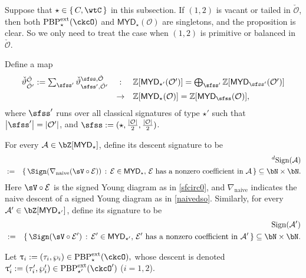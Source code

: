 \documentclass[11pt,a4paper]{amsart}
\def\MYD{{\mathsf{MYD}}}
\def\abs#1{\left|{#1}\right|}
\newcommand{\CA}{{\mathcal {A}}}
\newcommand{\CE}{{\mathcal {E}}}
\newcommand{\CO}{{\mathcal {O}}}
\newcommand{\Z}{\mathbb{Z}}
\newcommand{\be}{\begin {equation}}
\newcommand{\ee}{\end {equation}}
\numberwithin{equation}{section}
\theoremstyle{remark}
\def\subset{\subseteq}
\def\PBPes{\mathrm{PBP}^{\mathrm{ext}}_{\star}}
\def\PBPesp{\mathrm{PBP}^{\mathrm{ext}}_{\star'}}
\def\ckcOp{\ckcO^{\prime}}
\def\MYD{{\mathsf{MYD}}}
\begin{document}
Suppose that $\star\in \set{C,\wtC}$ in this subsection.
If $(1,2)$ is vacant or tailed in $\check \CO$, then both $\PBPes(\ckcO)$ and $\MYD_\star(\CO)$ are singletons, and the proposition is clear. So we only need to treat the case when  $(1,2)$ is primitive  or balanced in $\check \CO$.


Define a map
\be\label{thetaoop}
\begin{array}{rcl}
\check{\vartheta}_{\check \CO'}^{\check \CO}:=\sum_{\sfss'} \check{\vartheta}_{\sfss',\check \CO'}^{\sfss, \check \CO} & : & \Z[\MYD_{\star'}(\CO')]=
  \bigoplus_{\sfss'}
  \Z[\MYD_{\sfss'}(\CO')] \smallskip\\
  &\rightarrow& \Z[\MYD_{\star}(\CO)]=\Z[\MYD_{\sfss}(\CO)],
  \end{array}
  \ee
  where $\sfss'$ runs over all  classical signatures of type $\star'$ such that $\abs{\sfss'}=\abs{\CO'}$, and $\sfss:=(\star, \frac{|\CO|}{2}, \frac{|\CO|}{2})$.

For every $\CA\in \bZ[\MYD_{\star}] $, define its  descent signature to be
\begin{eqnarray*}
  && \dsign(\CA) \\
  &:=& \set{\Sign(\nabla_{\textrm{naive}}(\sV\circ \CE))\,:\, \CE\in \MYD_\star, \,\textrm{$\CE$ has a nonzero coefficient in $\CA$} }\subset \bN\times \bN.
\end{eqnarray*}
Here $\sV\circ \CE$ is the signed Young diagram as in \eqref{sfcirc0}, and $\nabla_{\textrm{naive}}$ indicates the naive descent of a signed Young diagram as in \eqref{naivedso}. Similarly, for every $\CA'\in \bZ[\MYD_{\star'}] $, define its   signature to be
\begin{eqnarray*}
  && \sign{\CA'} \\
  &:=& \set{\Sign(\sV\circ \CE') \,:\, \CE'\in \MYD_{\star'}, \,\textrm{$\CE'$ has a nonzero coefficient in $\CA'$} }\subset \bN\times \bN.
\end{eqnarray*}



Let
$ \uptau_i:=(\tau_i, \wp_i)\in \PBPes(\ckcO),
$
whose descent is denoted
$ \uptau'_i:=(\tau'_i, \wp'_i)\in \PBPesp(\ckcOp)$ ($i=1,2$).

\medskip
\end{document}
